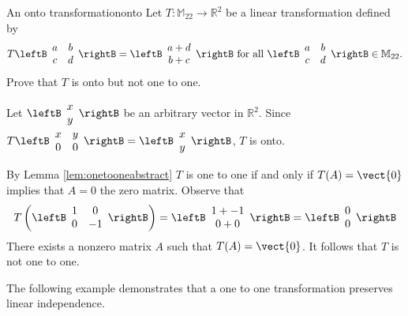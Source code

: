 \begin{example}{An onto transformation}{onto}
Let $T:\mathbb{M}_{22}\to\mathbb{R}^2$ be a linear transformation defined by
\[ T\leftB\begin{array}{cc}
a & b \\ c & d \end{array}\rightB
=
\leftB\begin{array}{c}
a+d \\ b+c \end{array}\rightB
\mbox{ for all }
\leftB\begin{array}{cc}
a & b \\ c & d \end{array}\rightB \in\mathbb{M}_{22}.\]
Prove that $T$ is onto but not one to one. 
\end{example}

\begin{solution}
Let $\leftB\begin{array}{c} x \\ y \end{array}\rightB$ be an arbitrary vector in $\mathbb{R}^2$. 
Since 
$T\leftB\begin{array}{cc} x & y \\ 0 & 0 \end{array}\rightB
=\leftB\begin{array}{c} x \\ y \end{array}\rightB$,
$T$  is onto.

By Lemma \ref{lem:onetooneabstract} $T$ is one to one if and only if $T(A) = \vect{0} $ implies that $A = 0$ the zero matrix.
Observe that
\[
T \left( \leftB\begin{array}{cc} 1 & 0 \\ 0 & -1 \end{array}\rightB \right)
=
\leftB \begin{array}{c}
1 + -1 \\
0 + 0 
\end{array}
\rightB
=
\leftB \begin{array}{c}
0 \\
0 
\end{array}
\rightB
\]
There exists a nonzero matrix $A$ such that $T(A) = \vect{0}$. It follows that $T$ is not one to one.
\end{solution}

The following example demonstrates that a one to one transformation preserves linear independence.

